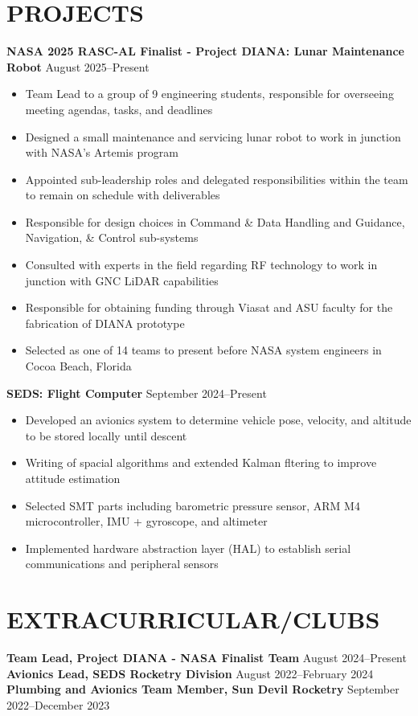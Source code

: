 \documentclass{article}
\begin{document}
	
	\section{PROJECTS}
	\textbf{NASA 2025 RASC-AL Finalist - Project DIANA: Lunar Maintenance Robot}
	\hfill
	\vspace{0.5em}
	August 2025--Present
	\begin{itemize}
		\item{ Team Lead to a group of 9 engineering students, responsible for overseeing meeting agendas, tasks, and deadlines}
		\item{ Designed a small maintenance and servicing lunar robot to work in junction with NASA's Artemis program}
		\item{ Appointed sub-leadership roles and delegated responsibilities within the team to remain on schedule with deliverables}
		\item{ Responsible for design choices in Command \& Data Handling and Guidance, Navigation, \& Control sub-systems}
		\item{ Consulted with experts in the field regarding RF technology to work in junction with GNC LiDAR capabilities}
		\item{ Responsible for obtaining funding through Viasat and ASU faculty for the fabrication of DIANA prototype}
		\item{ Selected as one of 14 teams to present before NASA system engineers in Cocoa Beach, Florida}
	\end{itemize}
	\vspace{1em}
	\textbf{SEDS: Flight Computer}
	\hfill
	\vspace{0.5em}
	September 2024--Present
	\begin{itemize}
		\item{ Developed an avionics system to determine vehicle pose, velocity, and altitude to be stored locally until descent}
		\item{ Writing of spacial algorithms and extended Kalman fltering to improve attitude estimation}
		\item{ Selected SMT parts including barometric pressure sensor, ARM M4 microcontroller, IMU + gyroscope, and altimeter}
		\item{ Implemented hardware abstraction layer (HAL) to establish serial communications and peripheral sensors}
	\end{itemize}
	
	
	\section{EXTRACURRICULAR/CLUBS}
	\textbf{Team Lead, Project DIANA - NASA Finalist Team}
	\hfill
	\vspace{0.5em}
	August 2024--Present
	\hfill \newline 
	\textbf{Avionics Lead, SEDS Rocketry Division}
	\hfill
	\vspace{0.5em}
	August 2022--February 2024
	\hfill \newline 
	\textbf{Plumbing and Avionics Team Member, Sun Devil Rocketry}
	\hfill
	\vspace{0.5em}
	September 2022--December 2023
	\vspace{0.5em}
	\thispagestyle{empty}
\end{document}
